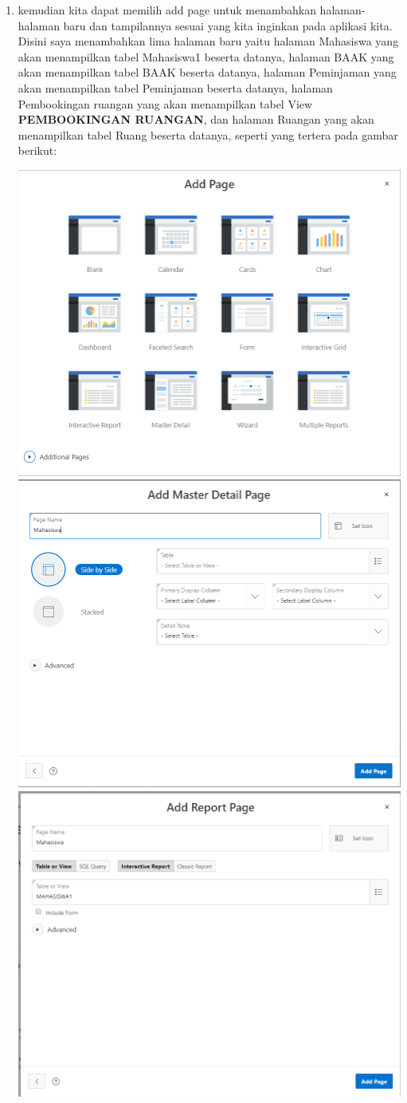 \documentclass{article}
\begin{document}
\begin{enumerate}
     \item  kemudian kita dapat memilih add page untuk menambahkan halaman-halaman baru dan tampilannya sesuai yang kita inginkan pada aplikasi kita. Disini saya menambahkan lima halaman baru yaitu halaman Mahasiswa yang akan menampilkan tabel Mahasiswa1 beserta datanya,  halaman BAAK yang akan menampilkan tabel BAAK beserta datanya, halaman Peminjaman yang akan menampilkan tabel Peminjaman beserta datanya, halaman Pembookingan ruangan yang akan menampilkan tabel View \textbf{PEMBOOKINGAN RUANGAN}, dan halaman Ruangan yang akan menampilkan tabel Ruang beserta datanya, seperti yang tertera pada gambar berikut:
     \begin{center}
     \includegraphics[width=.8\textwidth]{Figure/4.PNG}
     \includegraphics[width=.8\textwidth]{Figure/5.PNG}
     \includegraphics[width=.8\textwidth]{Figure/6.PNG}

\end{center}
\end{enumerate}
\end{document}

